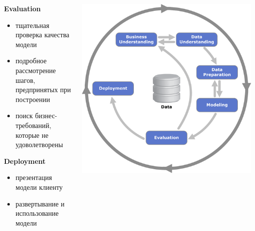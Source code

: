 \documentclass[aspectratio=169]{beamer}
\begin{document}
\begin{frame}{}

\begin{columns}
    \begin{column}{.7\textwidth}
		{\bf Evaluation}
		\begin{itemize}
		\item тщательная проверка качества модели
		\item подробное рассмотрение шагов, предпринятых при построении
		\item поиск бизнес-требований, которые не удоволетворены
		\end{itemize}
		
		\vspace{1em}

		{\bf Deployment}
		\begin{itemize}
		\item презентация модели клиенту
		\item развертывание и использование модели
		\end{itemize}
    \end{column}
    \begin{column}{.3\textwidth}
    \vspace{-0em}
		\begin{center}
   		\includegraphics[width=\textwidth]{images/crisp.png}
    \end{center}
    \end{column}
  \end{columns}

\end{frame}
\end{document}
